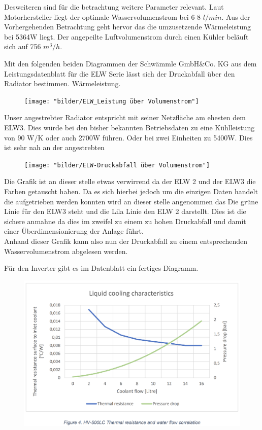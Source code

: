 Desweiteren sind für die betrachtung weitere Parameter relevant. Laut Motorhersteller liegt der optimale Wasservolumenstrom bei 6-8 \ensuremath{l/min}. Aus der Vorhergehenden Betrachtung geht hervor das die umzusetzende Wärmeleistung bei 5364W liegt. Der angepeilte Luftvolumenstrom durch einen Kühler beläuft sich auf 756 \ensuremath{m^3/h}.

Mit den folgenden beiden Diagrammen der Schwämmle GmbH\&Co. KG aus dem Leistungsdatenblatt für die ELW Serie lässt sich der Druckabfall über den Radiator bestimmen.  Wärmeleistung.

\begin{figure}[h]
	\centering
	\texttt{[image: "bilder/ELW\_Leistung über Volumenstrom"]}
	\caption{}
	\label{fig:elwleistung-uber-volumenstrom}
\end{figure}

Unser angestrebter Radiator entspricht mit seiner Netzfläche am ehesten dem ELW3. Dies würde bei den bisher bekannten Betriebsdaten zu eine Kühlleistung von 90 W/K oder auch 2700W führen. Oder bei zwei Einheiten zu 5400W. Dies ist sehr nah an der angestrebten

\begin{figure}[h]
	\centering
	\texttt{[image: "bilder/ELW-Druckabfall über Volumenstrom"]}
	\caption{}
	\label{fig:elw-druckabfall-uber-volumenstrom}
\end{figure}

Die Grafik ist an dieser stelle etwas verwirrend da der ELW 2 und der ELW3 die Farben getauscht haben. Da es sich hierbei jedoch um die einzigen Daten handelt die aufgetrieben werden konnten wird an dieser stelle angenommen das Die grüne Linie für den ELW3 steht und die Lila Linie den ELW 2 darstellt. Dies ist die sichere anmahne da dies im zweifel zu einem zu hohen Druckabfall und damit einer Überdimensionierung der Anlage führt.\\
Anhand dieser Grafik kann also nun der Druckabfall zu einem entsprechenden Wasservolumenstrom abgelesen werden.

Für den Inverter gibt es im Datenblatt ein fertiges Diagramm.
\begin{figure}[h]
	\centering
	\includegraphics[width=0.7\linewidth]{"bilder/Druckabfall DTI500LC"}
	\caption{}
	\label{fig:cooling-characteristik}
\end{figure}


